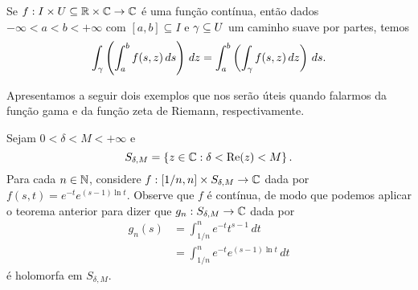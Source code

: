 %
\begin{corolario}
Se $f: I \times U \subseteq \mathbb{R} \times \mathbb{C} \to \mathbb{C}$ é uma função contínua, então
dados $-\infty < a < b < +\infty$ com $[a,b] \subseteq I$ e $\gamma\subseteq U$ um
caminho suave por partes, temos
%
\[
\int_{\gamma} \left( \int_a^b f(s,z) \, ds \right) \, dz 
= \int_a^b \left( \int_{\gamma} f(s,z) \, dz \right) \, ds.
\]
%
\end{corolario}
%
Apresentamos a seguir dois exemplos que nos serão úteis quando falarmos da
função gama e da função zeta de Riemann, respectivamente.
\begin{exemplo}
Sejam $0 < \delta < M < +\infty$ e
%
\[
S_{\delta, M} = \left\{ z\in\mathbb{C} : \delta < \mathrm{Re}(z) < M \right\}.
\]
%
Para cada $n\in\mathbb{N}$, considere $f:[1/n,n] \times S_{\delta, M} \to \mathbb{C}$ dada por
$f(s,t) = e^{-t} e^{(s-1)\ln t}$. Observe que $f$ é contínua, de modo que
podemos aplicar o teorema anterior para dizer que
$g_n:S_{\delta, M} \to \mathbb{C}$ dada por
%
\begin{align*}
    g_n(s) &= \int_{1/n}^n e^{-t}t^{s-1} \, dt \\
           &= \int_{1/n}^n e^{-t}e^{(s-1)\ln t} \, dt
\end{align*}
%
é holomorfa em $S_{\delta, M}$.
\end{exemplo}
%
